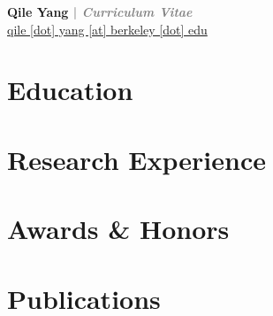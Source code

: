 \documentclass[11pt]{article} %
\newcommand{\myinput}[1]{
  
}
\newcommand{\socialicon}[2]{
  \hypersetup{hidelinks}
  \href{https://#2}{#1}
  \hypersetup{hidelinks=false}
}
\newcommand{\emailicon}[1]{
  \hypersetup{hidelinks}
  \faEnvelope \href{mailto:#1}{#1}
  \hypersetup{hidelinks=false}
}
\begin{document}

\begin{center}
  \Large\textbf{Qile Yang \textcolor{gray}{| \emph{Curriculum Vitae}}}\normalsize \\
  \href{mailto:qile.yang@berkeley.edu}{qile [dot] yang [at] berkeley [dot] edu} \\
  \socialicon{\faGlobe}{qile0317.github.io}
  \socialicon{\faLinkedin}{linkedin.com/in/qile0317}
  \socialicon{\faGithub}{github.com/Qile0317}
  \socialicon{\faGoogle}{scholar.google.com/citations?user=IsJeImQAAAAJ&hl=en}
  \socialicon{\faResearchgate}{www.researchgate.net/profile/Qile-Yang-2}
  \socialicon{\faOrcid}{orcid.org/my-orcid?orcid=0009-0005-0148-2499}
\end{center}

\RaggedRight


\section*{Education}
\myinput{education.tex}

\section*{Research Experience}
\label{exp_research}
\myinput{exp_research.tex}

\section*{Awards \& Honors}
\label{awards}
\myinput{awards.tex}


\newpage

\section*{Publications}
\label{pubs}

\end{document}
